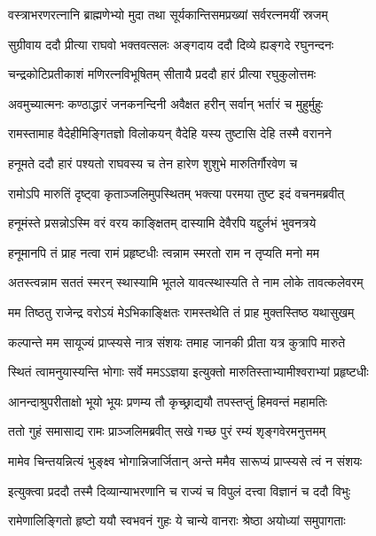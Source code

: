 \twolineshloka
{वस्त्राभरणरत्नानि ब्राह्मणेभ्यो मुदा तथा}
{सूर्यकान्तिसमप्रख्यां सर्वरत्नमयीं स्रजम्} %

\twolineshloka
{सुग्रीवाय ददौ प्रीत्या राघवो भक्तवत्सलः}
{अङ्गदाय ददौ दिव्ये ह्यङ्गदे रघुनन्दनः} %

\twolineshloka
{चन्द्रकोटिप्रतीकाशं मणिरत्नविभूषितम्}
{सीतायै प्रददौ हारं प्रीत्या रघुकुलोत्तमः} %

\twolineshloka
{अवमुच्यात्मनः कण्ठाद्धारं जनकनन्दिनी}
{अवैक्षत हरीन् सर्वान् भर्तारं च मुहुर्मुहुः} %

\twolineshloka
{रामस्तामाह वैदेहीमिङ्गितज्ञो विलोकयन्}
{वैदेहि यस्य तुष्टासि देहि तस्मै वरानने} %

\twolineshloka
{हनूमते ददौ हारं पश्यतो राघवस्य च}
{तेन हारेण शुशुभे मारुतिर्गौरवेण च} %

\twolineshloka
{रामोऽपि मारुतिं दृष्ट्वा कृताञ्जलिमुपस्थितम्}
{भक्त्या परमया तुष्ट इदं वचनमब्रवीत्} %

\twolineshloka
{हनूमंस्ते प्रसन्नोऽस्मि वरं वरय काङ्क्षितम्}
{दास्यामि देवैरपि यद्दुर्लभं भुवनत्रये} %

\twolineshloka
{हनूमानपि तं प्राह नत्वा रामं प्रहृष्टधीः}
{त्वन्नाम स्मरतो राम न तृप्यति मनो मम} %

\twolineshloka
{अतस्त्वन्नाम सततं स्मरन् स्थास्यामि भूतले}
{यावत्स्थास्यति ते नाम लोके तावत्कलेवरम्} %

\twolineshloka
{मम तिष्ठतु राजेन्द्र वरोऽयं मेऽभिकाङ्क्षितः}
{रामस्तथेति तं प्राह मुक्तस्तिष्ठ यथासुखम्} %

\twolineshloka
{कल्पान्ते मम सायूज्यं प्राप्स्यसे नात्र संशयः}
{तमाह जानकी प्रीता यत्र कुत्रापि मारुते} %

\twolineshloka
{स्थितं त्वामनुयास्यन्ति भोगाः सर्वे ममऽऽज्ञया}
{इत्युक्तो मारुतिस्ताभ्यामीश्वराभ्यां प्रहृष्टधीः} %

\twolineshloka
{आनन्दाश्रुपरीताक्षो भूयो भूयः प्रणम्य तौ}
{कृच्छ्राद्ययौ तपस्तप्तुं हिमवन्तं महामतिः} %

\twolineshloka
{ततो गुहं समासाद्य रामः प्राञ्जलिमब्रवीत्}
{सखे गच्छ पुरं रम्यं शृङ्गवेरमनुत्तमम्} %

\twolineshloka
{मामेव चिन्तयन्नित्यं भुङ्क्ष्व भोगान्निजार्जितान्}
{अन्ते ममैव सारूप्यं प्राप्स्यसे त्वं न संशयः} %

\twolineshloka
{इत्युक्त्वा प्रददौ तस्मै दिव्यान्याभरणानि च}
{राज्यं च विपुलं दत्त्वा विज्ञानं च ददौ विभुः} %

\twolineshloka
{रामेणालिङ्गितो हृष्टो ययौ स्वभवनं गुहः}
{ये चान्ये वानराः श्रेष्ठा अयोध्यां समुपागताः} %

